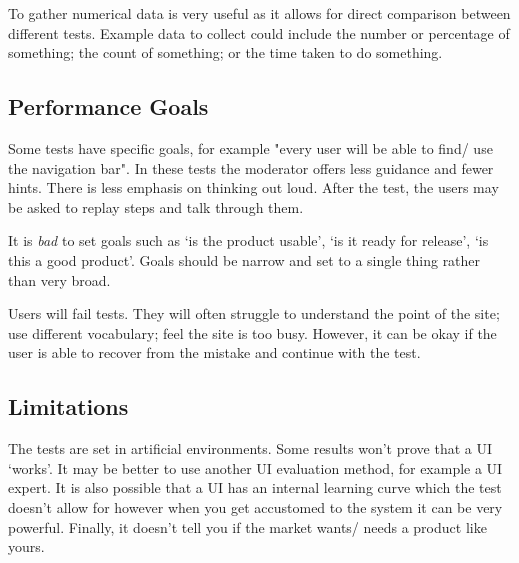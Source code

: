 To gather numerical data is very useful as it allows for direct comparison between different tests. Example data to collect could include the number or percentage of something; the count of something; or the time taken to do something. 

\subsection*{Performance Goals}
Some tests have specific goals, for example "every user will be able to find/ use the navigation bar". In these tests the moderator offers less guidance and fewer hints. There is less emphasis on thinking out loud. After the test, the users may be asked to replay steps and talk through them.

It is \textit{bad} to set goals such as `is the product usable', `is it ready for release', `is this a good product'. Goals should be narrow and set to a single thing rather than very broad.

Users will fail tests. They will often struggle to understand the point of the site; use different vocabulary; feel the site is too busy. However, it can be okay if the user is able to recover from the mistake and continue with the test.

\subsection*{Limitations}
The tests are set in artificial environments. Some results won't prove that a UI `works'. It may be better to use another UI evaluation method, for example a UI expert. It is also possible that a UI has an internal learning curve which the test doesn't allow for however when you get accustomed to the system it can be very powerful. Finally, it doesn't tell you if the market wants/ needs a product like  yours. 